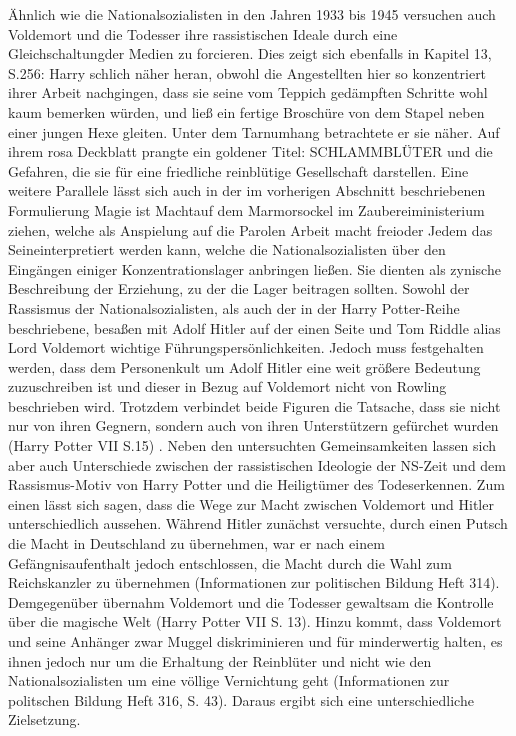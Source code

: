 Ähnlich wie die Nationalsozialisten in den Jahren 1933 bis 1945 versuchen auch Voldemort und die Todesser ihre rassistischen Ideale durch eine \glqq Gleichschaltung\grqq der Medien zu forcieren. Dies zeigt sich ebenfalls in Kapitel 13, S.256: \glqq Harry schlich näher heran, obwohl die Angestellten hier so konzentriert ihrer Arbeit nachgingen, dass sie seine vom Teppich gedämpften Schritte wohl kaum bemerken würden, und ließ ein fertige Broschüre von dem Stapel neben einer jungen Hexe gleiten. Unter dem Tarnumhang betrachtete er sie näher. Auf ihrem rosa Deckblatt prangte ein goldener Titel: SCHLAMMBLÜTER und die Gefahren, die sie für eine friedliche reinblütige Gesellschaft darstellen\grqq. Eine weitere Parallele lässt sich auch in der im vorherigen Abschnitt beschriebenen Formulierung \glqq Magie ist Macht\grqq auf dem Marmorsockel im Zaubereiministerium ziehen, welche als Anspielung auf die Parolen  \glqq Arbeit macht frei\grqq oder \glqq Jedem das Seine\grqq interpretiert werden kann, welche die Nationalsozialisten über den Eingängen einiger Konzentrationslager anbringen ließen. Sie dienten als zynische Beschreibung der \glqq Erziehung\grqq, zu der die Lager beitragen sollten. 
Sowohl der Rassismus der Nationalsozialisten, als auch der in der \glqq Harry Potter\grqq-Reihe beschriebene, besaßen mit Adolf Hitler auf der einen Seite und Tom Riddle alias Lord Voldemort wichtige Führungspersönlichkeiten. Jedoch muss festgehalten werden, dass dem Personenkult um Adolf Hitler eine weit größere Bedeutung zuzuschreiben ist und dieser in Bezug auf Voldemort nicht von Rowling beschrieben wird. Trotzdem verbindet beide Figuren die Tatsache, dass sie nicht nur von ihren Gegnern, sondern auch von ihren Unterstützern gefürchet wurden (Harry Potter VII S.15) . 
Neben den untersuchten Gemeinsamkeiten lassen sich aber auch  Unterschiede zwischen der rassistischen Ideologie der NS-Zeit und dem Rassismus-Motiv von \glqq Harry Potter und die Heiligtümer des Todes\grqq erkennen. Zum einen lässt sich sagen, dass die Wege zur Macht zwischen Voldemort und Hitler unterschiedlich aussehen. Während Hitler zunächst versuchte, durch einen Putsch die Macht in Deutschland zu übernehmen, war er nach einem Gefängnisaufenthalt jedoch entschlossen, die Macht durch die Wahl zum Reichskanzler zu übernehmen (Informationen zur politischen Bildung Heft 314). Demgegenüber übernahm Voldemort und die Todesser gewaltsam die Kontrolle über die magische Welt (Harry Potter VII S. 13). 
Hinzu kommt, dass Voldemort und seine Anhänger zwar Muggel diskriminieren und für minderwertig halten, es ihnen jedoch nur um die Erhaltung der Reinblüter und nicht wie den Nationalsozialisten um eine völlige Vernichtung geht (Informationen zur politschen Bildung Heft 316, S. 43). Daraus ergibt sich eine unterschiedliche Zielsetzung.
